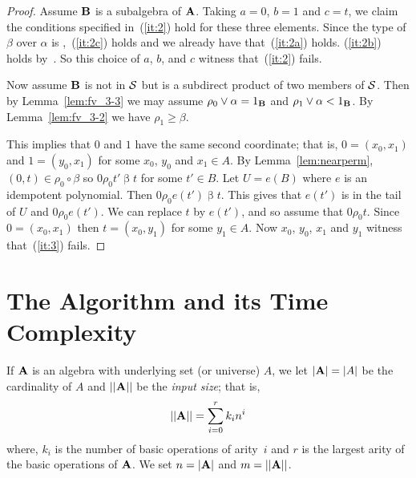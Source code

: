 \documentclass{ws-ijac}
\begin{document}
\begin{proof}
Assume $\mathbf{B}$ is a subalgebra of $\mathbf{A}$. Taking
$a=0$, $b=1$ and $c=t$, we claim the conditions specified
in~(\ref{it:2}) hold for these three elements.
Since the type of $\beta$ over $\alpha$ is \atyp,~(\ref{it:2c})
holds and we already have that~(\ref{it:2a}) holds.
(\ref{it:2b}) holds by~\cite[Theorem~2.4]{KearnesKiss1999}.
So this choice of $a$, $b$, and $c$ witness that~(\ref{it:2}) fails.




Now assume $\mathbf{B}$ is not in $\mathcal{S}$ but is a subdirect
product of two members of $\mathcal{S}$.
Then
by Lemma~\ref{lem:fv_3-3} we may
assume $\rho_0 \join \alpha = 1_{\alg B}$ and
$\rho_1 \join \alpha < 1_{\alg B}$. By Lemma~\ref{lem:fv_3-2}
we have $\rho_1 \ge \beta$.

This implies that $0$ and $1$ have the same second coordinate; that is,
$0 = (x_0,x_1)$ and $1 = (y_0,x_1)$ for some $x_0$, $y_0$ and $x_1\in A$.
By Lemma~\ref{lem:nearperm}, $(0,t) \in \rho_0 \circ \beta$
so $0 \mathrel {\rho_0} t' \mathrel{\beta} t$ for some $t' \in B$. Let $U = e(B)$
where $e$ is an idempotent polynomial. Then
$0 \mathrel {\rho_0} e(t') \mathrel{\beta} t$. This gives
that $e(t')$ is in the tail of $U$ and
$0 \mathrel{\rho_0} e(t')$. We can
replace $t$ by $e(t')$, and so assume that
$0 \mathrel{\rho_0} t$.
Since $0 = (x_0,x_1)$ then $t = (x_0,y_1)$ for some $y_1\in A$.
Now
$x_0$, $y_0$, $x_1$ and $y_1$ witness that~(\ref{it:3}) fails.
\end{proof}



\section{The Algorithm and its Time Complexity}
\label{sec:algorithm-its-time}
If $\mathbf{A}$ is an algebra with underlying set (or universe) $A$,
we let $|\mathbf{A}| = |A|$ be the cardinality of
$A$ and $||\mathbf{A}||$ be the \emph{input size}; that is,
\[
||\mathbf{A}|| = \sum_{i=0}^r k_i n^i
\]
where, $k_i$ is the number of basic operations of arity~$i$ and $r$
is the largest arity of the basic operations of $\mathbf{A}$. We set
$n = |\mathbf{A}|$ and $m = ||\mathbf{A}||$.

\end{document}
